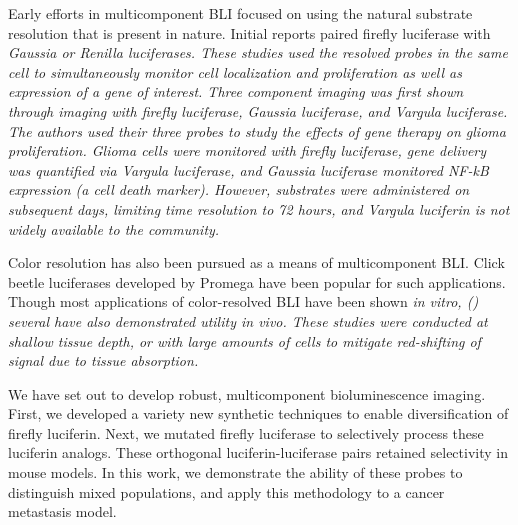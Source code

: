 Early efforts in multicomponent BLI focused on using the natural substrate resolution that is present in nature.
Initial reports paired firefly luciferase with \it{Gaussia} or \it{Renilla} luciferases.\cite{VilaltaDualluciferaselabelling2009,WendtvivoDualSubstrate2011,BhaumikOpticalimagingRenilla2004}
These studies used the resolved probes in the same cell to simultaneously monitor cell localization and proliferation as well as expression of a gene of interest.
Three component imaging was first shown through imaging with firefly luciferase, \it{Gaussia} luciferase, and \it{Vargula} luciferase.\cite{MaguireTripleBioluminescenceImaging2013}
The authors used their three probes to study the effects of gene therapy on glioma proliferation. Glioma cells were monitored with firefly luciferase, gene delivery was quantified via \it{Vargula} luciferase, and \it{Gaussia} luciferase monitored NF-kB expression (a cell death marker).
However, substrates were administered on subsequent days, limiting time resolution to 72 hours, and \it{Vargula} luciferin is not widely available to the community.

Color resolution has also been pursued as a means of multicomponent BLI. Click beetle luciferases developed by Promega have been popular for such applications.\cite{MezzanotteSensitivedualcolor2011,GammonSpectralUnmixingMulticolored2006,DanielDualColorBioluminescenceImaging2015}
Though most applications of color-resolved BLI have been shown \it{in vitro},\cite{GammonSpectralUnmixingMulticolored2006} () several have also demonstrated utility \it{in vivo}.\cite{MezzanotteSensitivedualcolor2011,DanielDualColorBioluminescenceImaging2015} These studies were conducted at shallow tissue depth, or with large amounts of cells to mitigate red-shifting of signal due to tissue absorption.

We have set out to develop robust, multicomponent bioluminescence imaging.
First, we developed a variety new synthetic techniques to enable diversification of firefly luciferin.\cite{McCutcheonRapidscalableassembly2015,McCutcheonExpedientsynthesiselectronically2012,SteinhardtDesignSynthesisAlkynyl2016,SteinhardtBrominatedLuciferinsAre2016,JonesOrthogonalLuciferaseLuciferinPairs2017}
Next, we mutated firefly luciferase to selectively process these luciferin analogs.\cite{JonesOrthogonalLuciferaseLuciferinPairs2017,RathbunParallelScreeningRapid2017}
These orthogonal luciferin-luciferase pairs retained selectivity in mouse models.\cite{RathbunParallelScreeningRapid2017} In this work, we demonstrate the ability of these probes to distinguish mixed populations, and apply this methodology to a cancer metastasis model.

